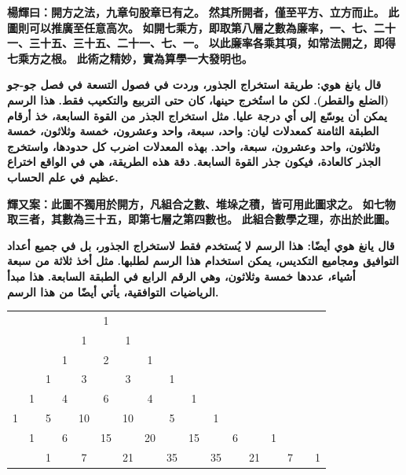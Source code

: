 \documentclass[11pt,a4paper]{article}
\newcommand{\bilingualrow}[2]{%
\noindent\begin{minipage}[t]{0.48\textwidth}#1\end{minipage}\hfill\begin{minipage}[t]{0.48\textwidth}\arabicfont\beginR #2\endR\end{minipage}\par\vspace{0.5cm}}
\begin{document}
\vspace{0.5em}

\bilingualrow{
\textbf{\color{commentarycolor}楊輝曰：開方之法，九章句股章已有之。}
\textbf{\color{commentarycolor}然其所開者，僅至平方、立方而止。}
\textbf{\color{commentarycolor}此圖則可以推廣至任意高次。}
\textbf{\color{commentarycolor}如開七乘方，即取第八層之數為廉率，一、七、二十一、三十五、三十五、二十一、七、一。}
\textbf{\color{commentarycolor}以此廉率各乘其項，如常法開之，即得七乘方之根。}
\textbf{\color{commentarycolor}此術之精妙，實為算學一大發明也。}
}{
\textbf{\color{commentarycolor}قال يانغ هوي: طريقة استخراج الجذور، وردت في فصول التسعة في فصل جو-جو (الضلع والقطر).}
\textbf{\color{commentarycolor}لكن ما استُخرج حينها، كان حتى التربيع والتكعيب فقط.}
\textbf{\color{commentarycolor}هذا الرسم يمكن أن يوسّع إلى أي درجة عليا.}
\textbf{\color{commentarycolor}مثل استخراج الجذر من القوة السابعة، خذ أرقام الطبقة الثامنة كمعدلات ليان: واحد، سبعة، واحد وعشرون، خمسة وثلاثون، خمسة وثلاثون، واحد وعشرون، سبعة، واحد.}
\textbf{\color{commentarycolor}بهذه المعدلات اضرب كل حدودها، واستخرج الجذر كالعادة، فيكون جذر القوة السابعة.}
\textbf{\color{commentarycolor}دقة هذه الطريقة، هي في الواقع اختراع عظيم في علم الحساب.}
}

\vspace{0.5em}

\bilingualrow{
\textbf{\color{commentarycolor}輝又案：此圖不獨用於開方，凡組合之數、堆垛之積，皆可用此圖求之。}
\textbf{\color{commentarycolor}如七物取三者，其數為三十五，即第七層之第四數也。}
\textbf{\color{commentarycolor}此組合數學之理，亦出於此圖。}
}{
\textbf{\color{commentarycolor}قال يانغ هوي أيضًا: هذا الرسم لا يُستخدم فقط لاستخراج الجذور، بل في جميع أعداد التوافيق ومجاميع التكديس، يمكن استخدام هذا الرسم لطلبها.}
\textbf{\color{commentarycolor}مثل أخذ ثلاثة من سبعة أشياء، عددها خمسة وثلاثون، وهي الرقم الرابع في الطبقة السابعة.}
\textbf{\color{commentarycolor}هذا مبدأ الرياضيات التوافقية، يأتي أيضًا من هذا الرسم.}
}

\vspace{1.5em}

\begin{center}
{\color{chartcolor}
\begin{tabular}{*{17}{c}}
& & & & & 1 & & & & & & & & & & & \\[0.6em]
& & & & 1 & & 1 & & & & & & & & & & \\[0.6em]
& & & 1 & & 2 & & 1 & & & & & & & & & \\[0.6em]
& & 1 & & 3 & & 3 & & 1 & & & & & & & & \\[0.6em]
& 1 & & 4 & & 6 & & 4 & & 1 & & & & & & & \\[0.6em]
1 & & 5 & & 10 & & 10 & & 5 & & 1 & & & & & & \\[0.6em]
& 1 & & 6 & & 15 & & 20 & & 15 & & 6 & & 1 & & & \\[0.6em]
& & 1 & & 7 & & 21 & & 35 & & 35 & & 21 & & 7 & & 1 \\
\end{tabular}
}
\end{center}
\end{document}
